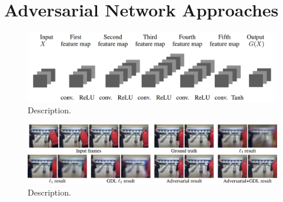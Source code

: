 \section{Adversarial Network Approaches}


\begin{figure}[htb]
	\centering
	\includegraphics[width=0.8\linewidth]{figures/related/deep_multiscale_generator.png} 
	\caption[Short]{Description.} \label{fig:gan_generator}
\end{figure}


\begin{figure}[htb]
	\centering
	\includegraphics[width=1.0\linewidth]{figures/related/deep_multiscale_samples.png} 
	\caption[Short]{Description.} \label{fig:gan_samples}
\end{figure}





